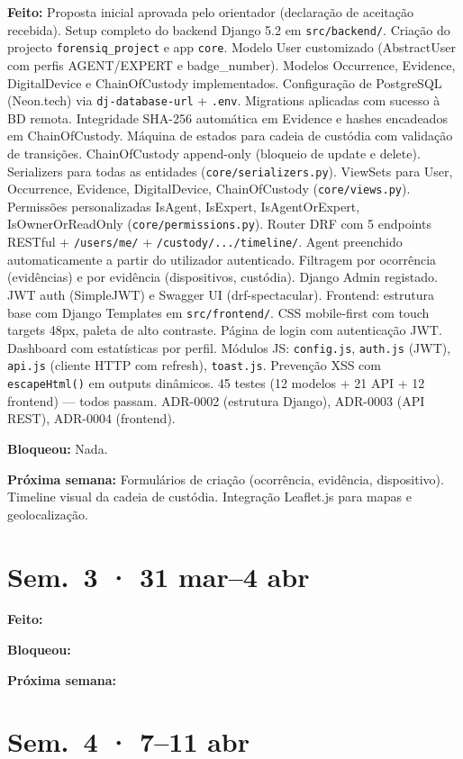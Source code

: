 \documentclass[a4paper,11pt]{article}
\newcommand{\semana}[2]{%
    \section{Sem.\ #1 · #2}%
}
\begin{document}
\textbf{Feito:} Proposta inicial aprovada pelo orientador (declaração de aceitação recebida).
Setup completo do backend Django 5.2 em \texttt{src/backend/}.
Criação do projecto \texttt{forensiq\_project} e app \texttt{core}.
Modelo User customizado (AbstractUser com perfis AGENT/EXPERT e badge\_number).
Modelos Occurrence, Evidence, DigitalDevice e ChainOfCustody implementados.
Configuração de PostgreSQL (Neon.tech) via \texttt{dj-database-url} + \texttt{.env}.
Migrations aplicadas com sucesso à BD remota.
Integridade SHA-256 automática em Evidence e hashes encadeados em ChainOfCustody.
Máquina de estados para cadeia de custódia com validação de transições.
ChainOfCustody append-only (bloqueio de update e delete).
Serializers para todas as entidades (\texttt{core/serializers.py}).
ViewSets para User, Occurrence, Evidence, DigitalDevice, ChainOfCustody (\texttt{core/views.py}).
Permissões personalizadas IsAgent, IsExpert, IsAgentOrExpert, IsOwnerOrReadOnly (\texttt{core/permissions.py}).
Router DRF com 5 endpoints RESTful + \texttt{/users/me/} + \texttt{/custody/.../timeline/}.
Agent preenchido automaticamente a partir do utilizador autenticado.
Filtragem por ocorrência (evidências) e por evidência (dispositivos, custódia).
Django Admin registado. JWT auth (SimpleJWT) e Swagger UI (drf-spectacular).
Frontend: estrutura base com Django Templates em \texttt{src/frontend/}.
CSS mobile-first com touch targets 48px, paleta de alto contraste.
Página de login com autenticação JWT. Dashboard com estatísticas por perfil.
Módulos JS: \texttt{config.js}, \texttt{auth.js} (JWT), \texttt{api.js} (cliente HTTP com refresh), \texttt{toast.js}.
Prevenção XSS com \texttt{escapeHtml()} em outputs dinâmicos.
45 testes (12 modelos + 21 API + 12 frontend) --- todos passam.
ADR-0002 (estrutura Django), ADR-0003 (API REST), ADR-0004 (frontend).

\textbf{Bloqueou:} Nada.

\textbf{Próxima semana:} Formulários de criação (ocorrência, evidência, dispositivo).
Timeline visual da cadeia de custódia.
Integração Leaflet.js para mapas e geolocalização.

\semana{3}{31 mar--4 abr}

\textbf{Feito:}

\textbf{Bloqueou:}

\textbf{Próxima semana:}

\semana{4}{7--11 abr}
\end{document}
